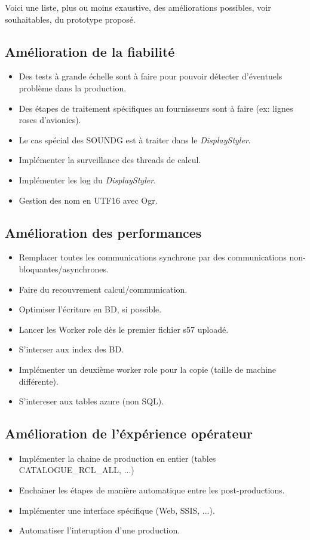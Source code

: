 
Voici une liste, plus ou moins exaustive, des améliorations possibles,
voir souhaitables, du prototype proposé.


\subsection{Amélioration de la fiabilité}

\begin{itemize}
\item[] Des tests à grande échelle sont à faire pour pouvoir détecter
  d'éventuels problème dans la production. 
\item[] Des étapes de traitement spécifiques au fournisseurs sont à
  faire (ex: lignes roses d'avionics).
\item[] Le cas spécial des SOUNDG est à traiter dans le
  \textit{DisplayStyler}.
\item[] Implémenter la surveillance des threads de calcul.
\item[] Implémenter les log du \textit{DisplayStyler}.
\item[] Gestion des nom en UTF16 avec Ogr.
\end{itemize}

\subsection{Amélioration des performances}


\begin{itemize}
\item[] Remplacer toutes les communications synchrone par des
  communications non-bloquantes/asynchrones.
\item[] Faire du recouvrement calcul/communication.
\item[] Optimiser l'écriture en BD, si possible.
\item[] Lancer les Worker role dès le premier fichier s57 uploadé.
\item[] S'interser aux index des BD.
\item[] Implémenter un deuxième worker role pour la copie (taille de
  machine différente).
\item[] S'intereser aux tables azure (non SQL).
\end{itemize}

\subsection{Amélioration de l'éxpérience opérateur}
\begin{itemize}
\item[] Implémenter la chaine de production en entier (tables
  CATALOGUE\_RCL\_ALL, ...)
\item[] Enchainer les étapes de manière automatique entre les
  post-productions.
\item[] Implémenter une interface spécifique (Web, SSIS, ...).
\item[] Automatiser l'interuption d'une production.
\end{itemize}



